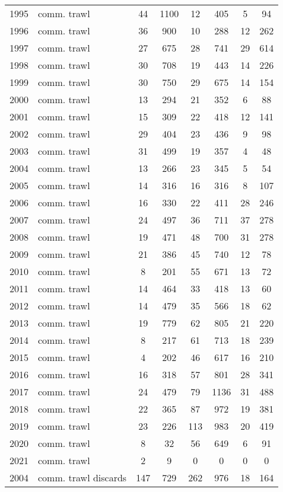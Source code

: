 \begin{longtable}[t]{c>{\centering\arraybackslash}p{3cm}cccccc}
1995 & comm. trawl & 44 & 1100 & 12 & 405 & 5 & 94\\
1996 & comm. trawl & 36 & 900 & 10 & 288 & 12 & 262\\
1997 & comm. trawl & 27 & 675 & 28 & 741 & 29 & 614\\
1998 & comm. trawl & 30 & 708 & 19 & 443 & 14 & 226\\
1999 & comm. trawl & 30 & 750 & 29 & 675 & 14 & 154\\
2000 & comm. trawl & 13 & 294 & 21 & 352 & 6 & 88\\
2001 & comm. trawl & 15 & 309 & 22 & 418 & 12 & 141\\
2002 & comm. trawl & 29 & 404 & 23 & 436 & 9 & 98\\
2003 & comm. trawl & 31 & 499 & 19 & 357 & 4 & 48\\
2004 & comm. trawl & 13 & 266 & 23 & 345 & 5 & 54\\
2005 & comm. trawl & 14 & 316 & 16 & 316 & 8 & 107\\
2006 & comm. trawl & 16 & 330 & 22 & 411 & 28 & 246\\
2007 & comm. trawl & 24 & 497 & 36 & 711 & 37 & 278\\
2008 & comm. trawl & 19 & 471 & 48 & 700 & 31 & 278\\
2009 & comm. trawl & 21 & 386 & 45 & 740 & 12 & 78\\
2010 & comm. trawl & 8 & 201 & 55 & 671 & 13 & 72\\
2011 & comm. trawl & 14 & 464 & 33 & 418 & 13 & 60\\
2012 & comm. trawl & 14 & 479 & 35 & 566 & 18 & 62\\
2013 & comm. trawl & 19 & 779 & 62 & 805 & 21 & 220\\
2014 & comm. trawl & 8 & 217 & 61 & 713 & 18 & 239\\
2015 & comm. trawl & 4 & 202 & 46 & 617 & 16 & 210\\
2016 & comm. trawl & 16 & 318 & 57 & 801 & 28 & 341\\
2017 & comm. trawl & 24 & 479 & 79 & 1136 & 31 & 488\\
2018 & comm. trawl & 22 & 365 & 87 & 972 & 19 & 381\\
2019 & comm. trawl & 23 & 226 & 113 & 983 & 20 & 419\\
2020 & comm. trawl & 8 & 32 & 56 & 649 & 6 & 91\\
2021 & comm. trawl & 2 & 9 & 0 & 0 & 0 & 0\\
2004 & comm. trawl discards & 147 & 729 & 262 & 976 & 18 & 164\\

\end{longtable}
